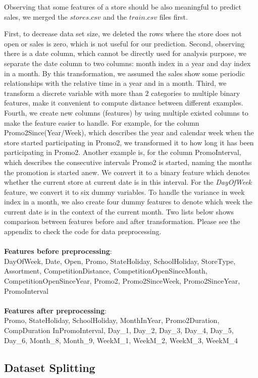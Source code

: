 \documentclass[11pt]{article}
\begin{document}
Observing that some features of a store should be also meaningful to predict sales, we merged the $stores.csv$ and the $train.csv$ files first.  

First, to decrease data set size, we deleted the rows where the store does not open or sales is zero, which is not useful for our prediction. Second, observing there is a date column, which cannot be directly used for analysis purpose, we separate the date column to two columns: month index in a year and day index in a month. By this transformation, we assumed the sales show some periodic relationships with the relative time in a year and in a month. Third, we transform a discrete variable with more than $2$ categories to multiple binary features, make it convenient to compute distance between different examples. Fourth, we create new columns (features) by using multiple existed columns to make the feature easier to handle. For example, for the column Promo2Since(Year/Week), which describes the year and calendar week when the store started participating in Promo2, we transformed it to how long it has been participating in Promo2. Another example is, for the column PromoInterval, which describes the consecutive intervals Promo2 is started, naming the months the promotion is started anew. We convert it to a binary feature which denotes whether the current store at current date is in this interval. For the \emph{DayOfWeek} feature, we convert it to six dummy variables. To handle the variance in week index in a month, we also create four dummy features to denote which week the current date is in the context of the current month. Two lists below shows comparison between features before and after transformation. Please see the appendix to check the code for data preprocessing. 
\\
\\
\textbf{Features before preprocessing}: \\
DayOfWeek, Date, Open, Promo, StateHoliday, SchoolHoliday, StoreType, Assortment, CompetitionDistance, CompetitionOpenSinceMonth, CompetitionOpenSinceYear, Promo2, Promo2SinceWeek, Promo2SinceYear, PromoInterval
\\
\\
\textbf{Features after preprocessing}:\\
Promo, StateHoliday, SchoolHoliday, MonthInYear, Promo2Duration, CompDuration	InPromoInterval, Day\_1, Day\_2, Day\_3, Day\_4, Day\_5, Day\_6, Month\_8, Month\_9, WeekM\_1, WeekM\_2, WeekM\_3, WeekM\_4

\subsection{Dataset Splitting}
\end{document}
